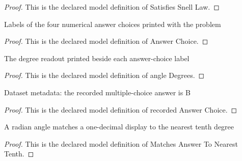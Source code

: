 \begin{proof}
  This is the declared model definition of Satisfies Snell Law.
\end{proof}
\begin{definition}
  \label{def:physics:phyx-mini-0036:phyxminiproblems-problemphyxmini0036-answerchoice}
  Labels of the four numerical answer choices printed with the problem
\end{definition}
\begin{proof}
  This is the declared model definition of Answer Choice.
\end{proof}
\begin{definition}
  \label{def:physics:phyx-mini-0036:phyxminiproblems-problemphyxmini0036-answerchoice-angledegrees}
  The degree readout printed beside each answer-choice label
\end{definition}
\begin{proof}
  This is the declared model definition of angle Degrees.
\end{proof}
\begin{definition}
  \label{def:physics:phyx-mini-0036:phyxminiproblems-problemphyxmini0036-recordedanswerchoice}
  Dataset metadata: the recorded multiple-choice answer is B
\end{definition}
\begin{proof}
  This is the declared model definition of recorded Answer Choice.
\end{proof}
\begin{definition}
  \label{def:physics:phyx-mini-0036:phyxminiproblems-problemphyxmini0036-matchesanswertonearesttenth}
  A radian angle matches a one-decimal display to the nearest tenth degree
\end{definition}
\begin{proof}
  This is the declared model definition of Matches Answer To Nearest Tenth.
\end{proof}
